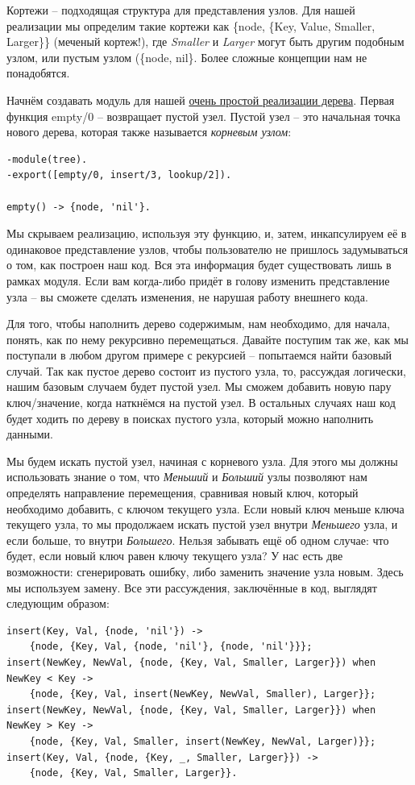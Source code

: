 \documentclass[a4paper,12pt]{report}
\newcommand{\ops}{\colorbox{lgreen}}
\begin{document}
Кортежи \--- подходящая структура для представления узлов. Для нашей реализации мы определим такие кортежи как \ops{\{node, \{Key, Value, Smaller, Larger\}\}} (меченый кортеж!), где \emph{Smaller} и \emph{Larger} могут быть другим подобным узлом, или пустым узлом (\ops{\{node, nil\}}. Более сложные концепции нам не понадобятся.

Начнём создавать модуль для нашей \href{http://learnyousomeerlang.com/static/erlang/tree.erl}{очень простой реализации дерева}. Первая функция \ops{empty/0} \--- возвращает пустой узел. Пустой узел \--- это начальная точка нового дерева, которая также называется \emph{корневым узлом}:
\begin{lstlisting}[style=erlang]
-module(tree).
-export([empty/0, insert/3, lookup/2]).
 
empty() -> {node, 'nil'}.
\end{lstlisting}

Мы скрываем реализацию, используя эту функцию, и, затем, инкапсулируем её в одинаковое представление узлов, чтобы пользователю не пришлось задумываться о том, как построен наш код. Вся эта информация будет существовать лишь в рамках модуля. Если вам когда\--либо придёт в голову изменить представление узла \--- вы сможете сделать изменения, не нарушая работу внешнего кода.

Для того, чтобы наполнить дерево содержимым, нам необходимо, для начала, понять, как по нему рекурсивно перемещаться. Давайте поступим так же, как мы поступали в любом другом примере с рекурсией \--- попытаемся найти базовый случай. Так как пустое дерево состоит из пустого узла, то, рассуждая логически, нашим базовым случаем будет пустой узел. Мы сможем добавить новую пару ключ/значение, когда наткнёмся на пустой узел. В остальных случаях наш код будет ходить по дереву в поисках пустого узла, который можно наполнить данными.

Мы будем искать пустой узел, начиная с корневого узла. Для этого мы должны использовать знание о том, что \emph{Меньший} и \emph{Больший} узлы позволяют нам определять направление перемещения, сравнивая новый ключ, который необходимо добавить, с ключом текущего узла. Если новый ключ меньше ключа текущего узла, то мы продолжаем искать пустой узел внутри \emph{Меньшего} узла, и если больше, то внутри \emph{Большего}. Нельзя забывать ещё об одном случае: что будет, если новый ключ равен ключу текущего узла? У нас есть две возможности: сгенерировать ошибку, либо заменить значение узла новым. Здесь мы используем замену. Все эти рассуждения, заключённые в код, выглядят следующим образом:
\begin{lstlisting}[style=erlang]
insert(Key, Val, {node, 'nil'}) ->
    {node, {Key, Val, {node, 'nil'}, {node, 'nil'}}};
insert(NewKey, NewVal, {node, {Key, Val, Smaller, Larger}}) when NewKey < Key ->
    {node, {Key, Val, insert(NewKey, NewVal, Smaller), Larger}};
insert(NewKey, NewVal, {node, {Key, Val, Smaller, Larger}}) when NewKey > Key ->
    {node, {Key, Val, Smaller, insert(NewKey, NewVal, Larger)}};
insert(Key, Val, {node, {Key, _, Smaller, Larger}}) ->
    {node, {Key, Val, Smaller, Larger}}.
\end{lstlisting}
\end{document}
